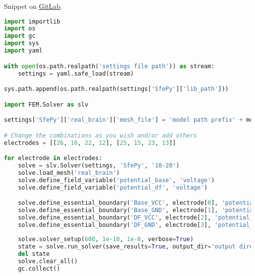 \pagebreak
\noindent Snippet on \href{https://gitlab.com/ttis-simulations/ttis-software/-/snippets/2068520}{GitLab}.
\begin{lstlisting}[language=Python,caption={Electrode position sweep study},captionpos=b,label=lst:electrode_position_sweep]
import importlib
import os
import gc
import sys
import yaml

with open(os.path.realpath('settings file path')) as stream:
    settings = yaml.safe_load(stream)

sys.path.append(os.path.realpath(settings['SfePy']['lib_path']))

import FEM.Solver as slv

settings['SfePy']['real_brain']['mesh_file'] = 'model path prefix' + model + 'model suffix'

# Change the combinations as you wish and/or add others
electrodes = [[26, 16, 22, 12], [25, 15, 23, 13]]

for electrode in electrodes:
    solve = slv.Solver(settings, 'SfePy', '10-20')
    solve.load_mesh('real_brain')
    solve.define_field_variable('potential_base', 'voltage')
    solve.define_field_variable('potential_df', 'voltage')

    solve.define_essential_boundary('Base_VCC', electrode[0], 'potential_base', 150.0)
    solve.define_essential_boundary('Base_GND', electrode[1], 'potential_base', -150.0)
    solve.define_essential_boundary('DF_VCC', electrode[2], 'potential_df', 150.0)
    solve.define_essential_boundary('DF_GND', electrode[3], 'potential_df', -150.0)
    
    solve.solver_setup(600, 1e-10, 1e-8, verbose=True)
    state = solve.run_solver(save_results=True, output_dir='output directory path', output_file_name='fem_model-name_' + "{}-{}-{}-{}".format(*electrode))
    del state
    solve.clear_all()
    gc.collect()
\end{lstlisting}

